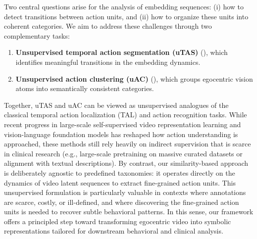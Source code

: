 Two central questions arise for the analysis of embedding sequences: (i) how to detect transitions between action units, and (ii) how to organize these units into coherent categories. We aim to address these challenges through two complementary tasks:

\begin{enumerate}
    \item \textbf{Unsupervised temporal action segmentation (uTAS)} (), which identifies meaningful transitions in the embedding dynamics.
    \item \textbf{Unsupervised action clustering (uAC)} (), which groups egocentric vision atoms into semantically consistent categories.  
\end{enumerate}

Together, uTAS and uAC can be viewed as unsupervised analogues of the classical temporal action localization (TAL) and action recognition tasks. While recent progress in large-scale self-supervised video representation learning and vision-language foundation models has reshaped how action understanding is approached, these methods still rely heavily on indirect supervision that is scarce in clinical research (e.g., large-scale pretraining on massive curated datasets or alignment with textual descriptions). By contrast, our similarity-based approach is deliberately agnostic to predefined taxonomies: it operates directly on the dynamics of video latent sequences to extract fine-grained action units. This unsupervised formulation is particularly valuable in contexts where annotations are scarce, costly, or ill-defined, and where discovering the fine-grained action units is needed to recover subtle behavioral patterns. In this sense, our framework offers a principled step toward transforming egocentric video into symbolic representations tailored for downstream behavioral and clinical analysis.










